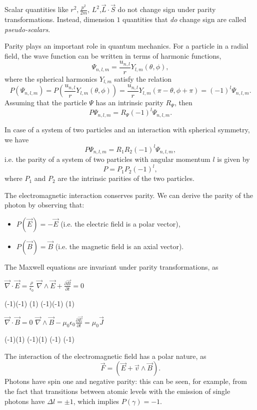 Scalar quantities like $r^2, \frac{p^2}{2m}$, $L^2$,$\vec{L}\cdot\vec{S}$ do not change sign under parity transformations. Instead, dimension \(1\) quantities that \emph{do} change sign are called \emph{pseudo-scalars}.

Parity plays an important role in quantum mechanics. For a particle in a radial field, the wave function can be written in terms of harmonic functions,
\[\Psi_{n,l,m}=\frac{u_{n,l}}{r}Y_{l,m}(\theta,\phi),
\]
where the spherical harmonics $Y_{l,m}$ satisfy the relation
\[
P(\Psi_{n,l,m})=P(\frac{u_{n,l}}{r}Y_{l,m}(\theta,\phi))=\frac{u_{n,l}}{r}Y_{l,m}(\pi-\theta,\phi+\pi)=(-1)^l\Psi_{n,l,m}.\]
Assuming that the particle $\Psi$ has an intrinsic parity $R_{\Psi}$, then
\[
P\Psi_{n,l,m}=R_{\Psi}(-1)^l\Psi_{n,l,m}.
\]

In case of a system of two particles and an interaction with spherical symmetry, we have
\[
     P\Psi_{n,l,m}=R_{1}R_{2}(-1)^l\Psi_{n,l,m},
\]
i.e. the parity of a system of two particles with angular momentum \(l\) is given by
\[
P=P_1P_2(-1)^l,
\] where \(P_1\) and \(P_2\) are the intrinsic parities of the two particles.%

The electromagnetic interaction conserves parity. We can derive the parity of the photon by observing that:
\begin{itemize}
    \item $P(\vec{E})=-\vec{E}$ \hskip 1cm (i.e. the electric field is a polar vector),
    \item $P(\vec{B})=\vec{B}$ \hskip 1cm (i.e. the magnetic field is an axial vector).
\end{itemize}
The Maxwell equations are invariant under parity transformations, as
\begin{center}
    $\vec{\nabla}\cdot\vec{E}=\frac{\rho}{\epsilon_{0}}$ \hskip 2cm
     $\vec{\nabla}\land\vec{E}+\frac{\partial\vec{B}}{\partial t}=0$ \end{center}
    \hskip 2.8cm \begin{small} (-1)(-1)\hskip 0.3cm (1)\hskip 2cm (-1)(-1)\hskip 0.4cm (1) \par \end{small} \vskip 0.9cm
    \begin{center} $\vec{\nabla}\cdot\vec{B}=0$\hskip 2cm
        $\vec{\nabla}\land\vec{B}-\mu_{0}\epsilon_{0}\frac{\partial\vec{E}}{\partial t}=\mu_{0}\vec{J}$\end{center}
    \hskip 2.4cm  \begin{small}  (-1)(1)\hskip 2.6cm (-1)(1) \hskip 1cm (-1) \hskip 0.5cm (-1) \end{small}\par \vskip 0.7cm 
The interaction of the electromagnetic field has a polar nature, as
\[\vec{F}=(\vec{E}+\vec{v}\land\vec{B}).\]
Photons have spin one and negative parity: this can be seen, for example, from the fact that transitions between atomic levels with the emission of single photons have $\Delta l=\pm1$, which implies \(P(\gamma)=-1\).

